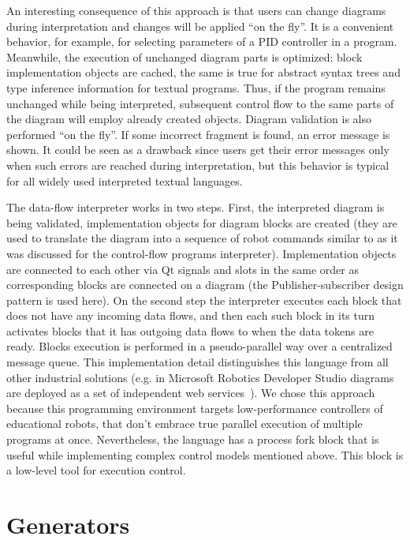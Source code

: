 \documentclass[conference]{IEEEtran}
\begin{document}
An interesting consequence of this approach is that users can change diagrams during interpretation and changes will be applied ``on the fly''. It is a convenient behavior, for example, for selecting parameters of a PID controller in a program. Meanwhile, the execution of unchanged diagram parts is optimized: block implementation objects are cached, the same is true for abstract syntax trees and type inference information for textual programs. Thus, if the program remains unchanged while being interpreted, subsequent control flow to the same parts of the diagram will employ already created objects. Diagram validation is also performed ``on the fly''. If some incorrect fragment is found, an error message is shown. It could be seen as a drawback since users get their error messages only when such errors are reached during interpretation, but this behavior is typical for all widely used interpreted textual languages.

The data-flow interpreter works in two steps. First, the interpreted diagram is being validated, implementation objects for diagram blocks are created (they are used to translate the diagram into a sequence of robot commands similar to as it was discussed for the control-flow programs interpreter). Implementation objects are connected to each other via Qt signals and slots in the same order as corresponding blocks are connected on a diagram (the Publisher-subscriber design pattern is used here). On the second step the interpreter executes each block that does not have any incoming data flows, and then each such block in its turn activates blocks that it has outgoing data flows to when the data tokens are ready. Blocks execution is performed in a pseudo-parallel way over a centralized message queue. This implementation detail distinguishes this language from all other industrial solutions (e.g. in Microsoft Robotics Developer Studio diagrams are deployed as a set of independent web services~\cite{jackson2007microsoft}). We chose this approach because this programming environment targets low-performance controllers of educational robots, that don't embrace true parallel execution of multiple programs at once. Nevertheless, the language has a process fork block that is useful while implementing complex control models mentioned above. This block is a low-level tool for execution control.

\section{Generators}
\label{chapter:generators}
\end{document}

